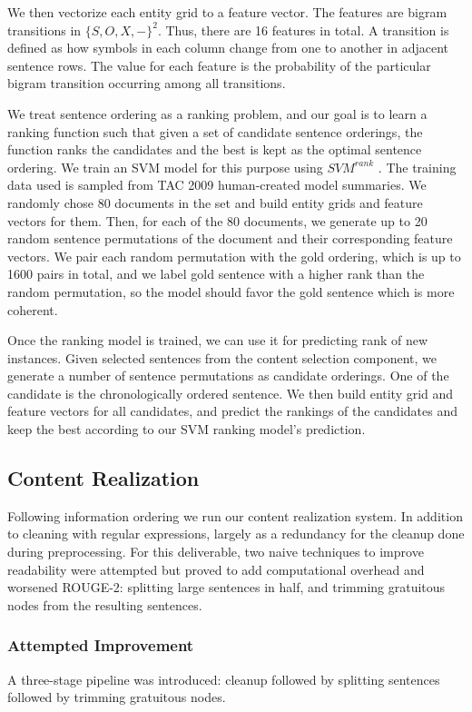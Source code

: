 \documentclass[11pt,a4paper]{article}
\begin{document}
We then vectorize each entity grid to a feature vector. The features are bigram transitions in $\{S,O,X,-\}^2$. Thus, there are 16 features in total. A transition is defined as how symbols in each column change from one to another in adjacent sentence rows. The value for each feature is the probability of the particular bigram transition occurring among all transitions.

We treat sentence ordering as a ranking problem, and our goal is to learn a ranking function such that given a set of candidate sentence orderings, the function ranks the candidates and the best is kept as the optimal sentence ordering. We train an SVM model for this purpose using $SVM^{rank}$ \citep{joachims2006training}. The training data used is sampled from TAC 2009 human-created model summaries. We randomly chose 80 documents in the set and build entity grids and feature vectors for them. Then, for each of the 80 documents, we generate up to 20 random sentence permutations of the document and their corresponding feature vectors. We pair each random permutation with the gold ordering, which is up to 1600 pairs in total, and we label gold sentence with a higher rank than the random permutation, so the model should favor the gold sentence which is more coherent.

Once the ranking model is trained, we can use it for predicting rank of new instances. Given selected sentences from the content selection component, we generate a number of sentence permutations as candidate orderings. One of the candidate is the chronologically ordered sentence. We then build entity grid and feature vectors for all candidates, and predict the rankings of the candidates and keep the best according to our SVM ranking model's prediction. 
\subsection{Content Realization}
Following information ordering we run our content realization system. In addition to cleaning with regular expressions, largely as a redundancy for the cleanup done during preprocessing. For this deliverable, two naive techniques to improve readability were attempted but proved to add computational overhead and worsened ROUGE-2: splitting large sentences in half, and trimming gratuitous nodes from the resulting sentences.
\subsubsection{Attempted Improvement}
A three-stage pipeline was introduced: cleanup followed by splitting sentences followed by trimming gratuitous nodes. 
\end{document}
